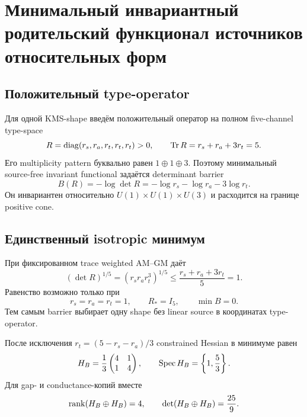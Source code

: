 \chapter{Минимальный инвариантный родительский функционал источников относительных форм}
\label{ch:v9-endpoint-kms-shape-invariant-parent}

\section{Положительный type-operator}

Для одной KMS-shape введём положительный оператор на полном five-channel
type-space
\begin{equation}
 R=\operatorname{diag}(r_s,r_a,r_t,r_t,r_t)>0,
 \qquad \operatorname{Tr} R=r_s+r_a+3r_t=5.
 \label{eq:v9-kms-shape-invariant-parent-operator}
\end{equation}
Его multiplicity pattern буквально равен $1\oplus1\oplus3$. Поэтому
минимальный source-free invariant functional задаётся determinant barrier
\begin{equation}
 B(R)=-\log\det R
 =-\log r_s-\log r_a-3\log r_t.
 \label{eq:v9-kms-shape-invariant-parent-barrier}
\end{equation}
Он инвариантен относительно $U(1)\times U(1)\times U(3)$ и расходится на
границе positive cone.

\section{Единственный isotropic минимум}

При фиксированном trace weighted AM--GM даёт
\begin{equation}
 (\det R)^{1/5}=(r_sr_ar_t^3)^{1/5}
 \leq\frac{r_s+r_a+3r_t}{5}=1.
 \label{eq:v9-kms-shape-invariant-parent-amgm}
\end{equation}
Равенство возможно только при
\begin{equation}
 r_s=r_a=r_t=1,
 \qquad R_*=I_5,
 \qquad \min B=0.
 \label{eq:v9-kms-shape-invariant-parent-minimum}
\end{equation}
Тем самым barrier выбирает одну shape без linear source в координатах
type-operator.

После исключения $r_t=(5-r_s-r_a)/3$ constrained Hessian в минимуме равен
\begin{equation}
 H_B=\frac13\begin{pmatrix}4&1\\1&4\end{pmatrix},
 \qquad
 \operatorname{Spec} H_B=\left\{1,\frac53\right\}.
 \label{eq:v9-kms-shape-invariant-parent-hessian}
\end{equation}
Для gap- и conductance-копий вместе
\begin{equation}
 \operatorname{rank}(H_B\oplus H_B)=4,
 \qquad
 \det(H_B\oplus H_B)=\frac{25}{9}.
 \label{eq:v9-kms-shape-invariant-parent-doubled-hessian}
\end{equation}

